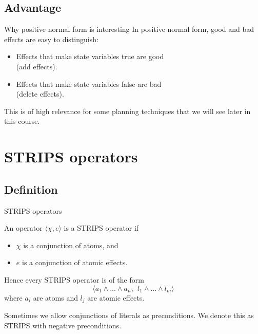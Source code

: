 \documentclass{gkibeamer}
\begin{document}
\subsection{Advantage}

\begin{frame}{Why positive normal form is interesting}
  In positive normal form, good and bad effects are easy to distinguish:
  \begin{itemize}
  \item Effects that make state variables true are good \\
    (\alert{add effects}).
  \item Effects that make state variables false are bad \\
    (\alert{delete effects}).
  \end{itemize}
  \bigskip

  This is of high relevance for some planning techniques that we will see 
  later in this course.
\end{frame}

\section[STRIPS]{STRIPS operators}
\subsection{Definition}
\begin{frame}{STRIPS operators}
  \begin{definition}
    An operator $\langle \chi,e\rangle$ is a \alert{STRIPS operator} if
    \begin{itemize}
    \item $\chi$ is a conjunction of atoms, and
    \item $e$ is a conjunction of atomic effects.
    \end{itemize}
  \end{definition}

  Hence every STRIPS operator is of the form
  \[
    \langle a_1\land\dots\land a_n,\ \ l_1\land\dots\land l_m\rangle
    \]
  where $a_i$ are atoms and $l_j$ are atomic effects.
  \medskip

   Sometimes we allow conjunctions of \alert{literals}
    as preconditions. We denote this as \alert{STRIPS with negative
    preconditions}.
\end{frame}
\end{document}
